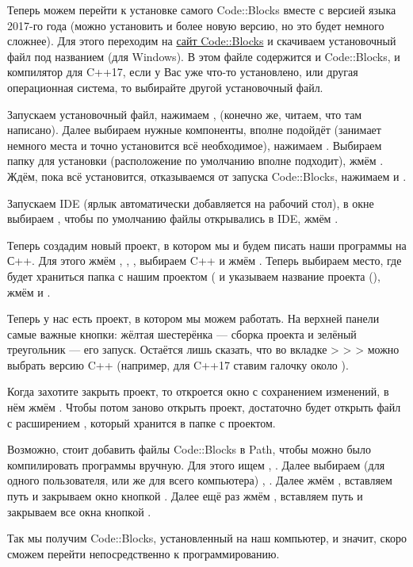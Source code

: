 Теперь можем перейти к установке самого Code::Blocks вместе с версией языка 2017-го года (можно установить и более новую версию, но это будет немного сложнее). Для этого переходим на \href{https://www.codeblocks.org/downloads/binaries/}{сайт Code::Blocks} и скачиваем установочный файл под названием  (для Windows). В этом файле содержится и Code::Blocks, и компилятор для C++17, если у Вас уже что-то установлено, или другая операционная система, то выбирайте другой установочный файл.

Запускаем установочный файл, нажимаем ,  (конечно же, читаем, что там написано). Далее выбираем нужные компоненты, вполне подойдёт  (занимает немного места и точно установится всё необходимое), нажимаем . Выбираем папку для установки (расположение по умолчанию вполне подходит), жмём . Ждём, пока всё установится, отказываемся от запуска Code::Blocks, нажимаем  и . 

Запускаем IDE (ярлык автоматически добавляется на рабочий стол), в окне  выбираем , чтобы по умолчанию файлы открывались в IDE, жмём .

Теперь создадим новый проект, в котором мы и будем писать наши программы на С++. Для этого жмём , , , выбираем C++ и жмём . Теперь выбираем место, где будет храниться папка с нашим проектом ( и указываем название проекта (), жмём  и .

Теперь у нас есть проект, в котором мы можем работать. На верхней панели самые важные кнопки: жёлтая шестерёнка — сборка проекта и зелёный треугольник — его запуск. Остаётся лишь сказать, что во вкладке  >  >  >  можно выбрать версию C++ (например, для C++17 ставим галочку около ).

Когда захотите закрыть проект, то откроется окно с сохранением изменений, в нём жмём . Чтобы потом заново открыть проект, достаточно будет открыть файл с расширением , который хранится в папке с проектом.

Возможно, стоит добавить файлы Code::Blocks в Path, чтобы можно было компилировать программы вручную. Для этого ищем , . Далее выбираем (для одного пользователя, или же для всего компьютера) , . Далее жмём , вставляем путь  и закрываем окно кнопкой . Далее ещё раз жмём , вставляем путь  и закрываем все окна кнопкой .

Так мы получим Code::Blocks, установленный на наш компьютер, и значит, скоро сможем перейти непосредственно к программированию.
